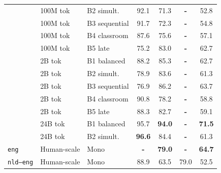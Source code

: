 \begin{table}[t]
\begin{minipage}[t]{0.49\linewidth}
\begin{tabular}{ll l cc cc}
 & 100M tok & B2 simult. & \cellcolor[rgb]{0.767,1.000,0.767} 92.1 & \cellcolor[rgb]{0.884,1.000,0.884} 71.3 & \textbf{-} & \cellcolor[rgb]{0.977,1.000,0.977} 52.8 \\
 & 100M tok & B3 sequential & \cellcolor[rgb]{0.769,1.000,0.769} 91.7 & \cellcolor[rgb]{0.878,1.000,0.878} 72.3 & \textbf{-} & \cellcolor[rgb]{0.960,1.000,0.960} 54.8 \\
 & 100M tok & B4 classroom & \cellcolor[rgb]{0.792,1.000,0.792} 87.6 & \cellcolor[rgb]{0.860,1.000,0.860} 75.6 & \textbf{-} & \cellcolor[rgb]{0.942,1.000,0.942} 57.1 \\
 & 100M tok & B5 late & \cellcolor[rgb]{0.861,1.000,0.861} 75.2 & \cellcolor[rgb]{0.820,1.000,0.820} 83.0 & \textbf{-} & \cellcolor[rgb]{0.895,1.000,0.895} 62.7 \\
\addlinespace[1.5pt]
 & 2B tok & B1 balanced & \cellcolor[rgb]{0.789,1.000,0.789} 88.2 & \cellcolor[rgb]{0.807,1.000,0.807} 85.3 & \textbf{-} & \cellcolor[rgb]{0.895,1.000,0.895} 62.7 \\
 & 2B tok & B2 simult. & \cellcolor[rgb]{0.840,1.000,0.840} 78.9 & \cellcolor[rgb]{0.817,1.000,0.817} 83.6 & \textbf{-} & \cellcolor[rgb]{0.907,1.000,0.907} 61.3 \\
 & 2B tok & B3 sequential & \cellcolor[rgb]{0.851,1.000,0.851} 76.9 & \cellcolor[rgb]{0.803,1.000,0.803} 86.2 & \textbf{-} & \cellcolor[rgb]{0.887,1.000,0.887} 63.7 \\
 & 2B tok & B4 classroom & \cellcolor[rgb]{0.774,1.000,0.774} 90.8 & \cellcolor[rgb]{0.846,1.000,0.846} 78.2 & \textbf{-} & \cellcolor[rgb]{0.928,1.000,0.928} 58.8 \\
 & 2B tok & B5 late & \cellcolor[rgb]{0.788,1.000,0.788} 88.3 & \cellcolor[rgb]{0.822,1.000,0.822} 82.7 & \textbf{-} & \cellcolor[rgb]{0.925,1.000,0.925} 59.1 \\
\addlinespace[1.5pt]
 & 24B tok & B1 balanced & \cellcolor[rgb]{0.747,1.000,0.747} 95.7 & \cellcolor[rgb]{0.760,1.000,0.760} \textbf{94.0} & \textbf{-} & \cellcolor[rgb]{0.823,1.000,0.823} \textbf{71.5} \\
 & 24B tok & B2 simult. & \cellcolor[rgb]{0.742,1.000,0.742} \textbf{96.6} & \cellcolor[rgb]{0.812,1.000,0.812} 84.4 & \textbf{-} & \cellcolor[rgb]{0.907,1.000,0.907} 61.3 \\
\midrule
\texttt{eng} & Human-scale & Mono & \textbf{-} & \cellcolor[rgb]{0.842,1.000,0.842} \textbf{79.0} & \textbf{-} & \cellcolor[rgb]{0.879,1.000,0.879} \textbf{64.7} \\
\midrule
\texttt{nld--eng} & Human-scale & Mono & \cellcolor[rgb]{0.785,1.000,0.785} 88.9 & \cellcolor[rgb]{0.926,1.000,0.926} 63.5 & \cellcolor[rgb]{0.794,1.000,0.794} 79.0 & \cellcolor[rgb]{0.979,1.000,0.979} 52.5 \\

\end{tabular}
\end{minipage}
\end{table}
